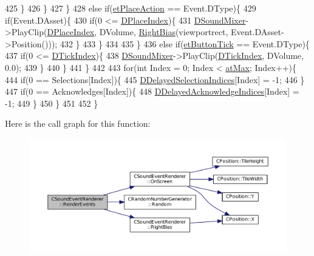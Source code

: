 \begin{DoxyCode}
425                 \}
426             \}
427         \}
428         \textcolor{keywordflow}{else} \textcolor{keywordflow}{if}(\hyperlink{GameModel_8h_abfcf510bafec7c6429906a6ecaac656da6b069d43a732ecd2eec5fbcebf3e41ee}{etPlaceAction} == Event.DType)\{
429             \textcolor{keywordflow}{if}(Event.DAsset)\{
430                 \textcolor{keywordflow}{if}(0 <= \hyperlink{classCSoundEventRenderer_a0ca919430ff2fb57324c0ee712c5b7b1}{DPlaceIndex})\{
431                     \hyperlink{classCSoundEventRenderer_a5abf598a7e8783d9cc78e0d33a65c9c2}{DSoundMixer}->PlayClip(\hyperlink{classCSoundEventRenderer_a0ca919430ff2fb57324c0ee712c5b7b1}{DPlaceIndex}, DVolume, 
      \hyperlink{classCSoundEventRenderer_a4be5ff09785c55c3b5b6966fb41eb47f}{RightBias}(viewportrect, Event.DAsset->Position()));
432                 \}
433             \}
434                
435         \}
436         \textcolor{keywordflow}{else} \textcolor{keywordflow}{if}(\hyperlink{GameModel_8h_abfcf510bafec7c6429906a6ecaac656dafe7284f9af34794514e5dbfe974e3296}{etButtonTick} == Event.DType)\{
437             \textcolor{keywordflow}{if}(0 <= \hyperlink{classCSoundEventRenderer_a810ef7feb31ba13f89919ed78d0cee25}{DTickIndex})\{
438                 \hyperlink{classCSoundEventRenderer_a5abf598a7e8783d9cc78e0d33a65c9c2}{DSoundMixer}->PlayClip(\hyperlink{classCSoundEventRenderer_a810ef7feb31ba13f89919ed78d0cee25}{DTickIndex}, DVolume, 0.0);
439             \}
440         \}
441     \}
442     
443     \textcolor{keywordflow}{for}(\textcolor{keywordtype}{int} Index = 0; Index < \hyperlink{GameDataTypes_8h_a5600d4fc433b83300308921974477feca92fbf60b4e5c335160f915b6a1c17c05}{atMax}; Index++)\{
444         \textcolor{keywordflow}{if}(0 == Selections[Index])\{
445             \hyperlink{classCSoundEventRenderer_ab2103a634f4ba6d12824ecddf6693870}{DDelayedSelectionIndices}[Index] = -1;
446         \}
447         \textcolor{keywordflow}{if}(0 == Acknowledges[Index])\{
448             \hyperlink{classCSoundEventRenderer_a8e36efd07e98242ea3a80564c595e397}{DDelayedAcknowledgeIndices}[Index] = -1;
449         \}
450     \}
451 
452 \}
\end{DoxyCode}
Here is the call graph for this function\+:\nopagebreak
\begin{figure}[H]
\begin{center}
\leavevmode
\includegraphics[width=350pt]{classCSoundEventRenderer_aa8b0c3029ea920ae4f4a08b9d9dd1c9c_cgraph}
\end{center}
\end{figure}
